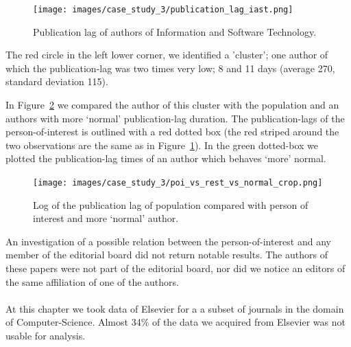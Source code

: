 \documentclass{ou-report}
\newcommand{\outline}[1]{{\color{blue} #1}}
\begin{document}
\begin{figure}[H]
    \centering
    \texttt{[image: images/case\_study\_3/publication\_lag\_iast.png]}
    \caption{Publication lag of authors of Information and Software Technology.}
    \label{fig:cs3_publag_iast}
\end{figure}

The red circle in the left lower corner, we identified a 'cluster'; one author
of which the publication-lag was two times very low; 8 and 11 days (average
270, standard deviation 115). 

In Figure~\ref{fig:cs3_pop_vs_poi} we compared the author of this cluster with
the population and an authors with more `normal' publication-lag duration. 
The publication-lags of the person-of-interest is outlined with a red dotted box
(the red striped around the two observations are the same as in
Figure~\ref{fig:cs3_publag_iast}).
In the green dotted-box we plotted the publication-lag times of an author which
behaves `more' normal.

\begin{figure}[H]
    \centering
    \texttt{[image: images/case\_study\_3/poi\_vs\_rest\_vs\_normal\_crop.png]}
    \caption{Log of the publication lag of population compared with person of interest and more `normal' author.}
    \label{fig:cs3_pop_vs_poi}
\end{figure}

An investigation of a possible relation between the person-of-interest and any
member of the editorial board did not return notable results. The authors of
these papers were not part of the editorial board, nor did we notice an editors
of the same affiliation of one of the authors.


\paragraph{}
At this chapter we took data of Elsevier for a a subset of journals in the
domain of Computer-Science. Almost 34\% of the data we acquired from Elsevier 
was not usable for analysis. 
\end{document}
